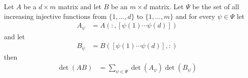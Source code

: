 \begin{thm}\label{CauchyBinetTheorem} Let $A$ be a $d \times m$ matrix and let $B$ be an $m \times d$ matrix.  Let $\Psi$ be the set of all increasing injective functions from $\lbrace 1, \dotsc, d \rbrace$ to $\lbrace 1, \dotsc, m \rbrace$ and for every $\psi \in \Psi$ let 
\begin{align*}
A_\psi &= A( : , [\psi(1) \dotsb \psi(d)])
\end{align*}
and let 
\begin{align*}
B_\psi &= B( [\psi(1) \dotsb \psi(d)], :)
\end{align*}
then 
\begin{align*}
\det(AB) &= \sum_{\psi \in \Psi} \det(A_\psi) \det(B_\psi)
\end{align*}
\end{thm}

